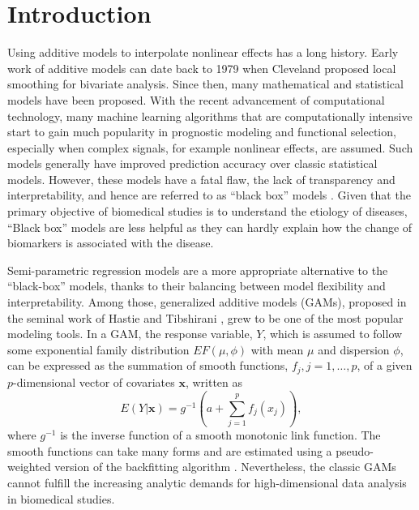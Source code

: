 \documentclass[AMA,STIX1COL,]{WileyNJD-v2}
\begin{document}
\hypertarget{introduction}{%
\section{Introduction}\label{introduction}}

\label{sec:intro}

Using additive models to interpolate nonlinear effects has a long
history. Early work of additive models can date back to 1979 when
Cleveland \citep{Cleveland1979} proposed local smoothing for bivariate
analysis. Since then, many mathematical and statistical models have been
proposed. \citep{Wood2020} With the recent advancement of computational
technology, many machine learning algorithms that are computationally
intensive start to gain much popularity in prognostic modeling and
functional selection, especially when complex signals, for example
nonlinear effects, are assumed. Such models generally have improved
prediction accuracy over classic statistical models. However, these
models have a fatal flaw, the lack of transparency and interpretability,
and hence are referred to as ``black box'' models \citep{Breiman2001}.
Given that the primary objective of biomedical studies is to understand
the etiology of diseases, ``Black box'' models are less helpful as they
can hardly explain how the change of biomarkers is associated with the
disease.

Semi-parametric regression models are a more appropriate alternative to
the ``black-box'' models, thanks to their balancing between model
flexibility and interpretability. Among those, generalized additive
models (GAMs), proposed in the seminal work of Hastie and Tibshirani
\citep{Hastie1987}, grew to be one of the most popular modeling tools.
In a GAM, the response variable, \(Y\), which is assumed to follow some
exponential family distribution \(EF(\mu, \phi)\) with mean \(\mu\) and
dispersion \(\phi\), can be expressed as the summation of smooth
functions, \(f_j, j = 1, \dots, p\), of a given \(p\)-dimensional vector
of covariates \(\boldsymbol{x}\), written as \[
 E(Y|\boldsymbol{x}) = g^{-1}(a + \sum\limits^p_{j=1}f_j(x_j)),
\] where \(g^{-1}\) is the inverse function of a smooth monotonic link
function. The smooth functions can take many forms and are estimated
using a pseudo-weighted version of the backfitting algorithm
\citep{Breiman1985}. Nevertheless, the classic GAMs cannot fulfill the
increasing analytic demands for high-dimensional data analysis in
biomedical studies.
\end{document}
